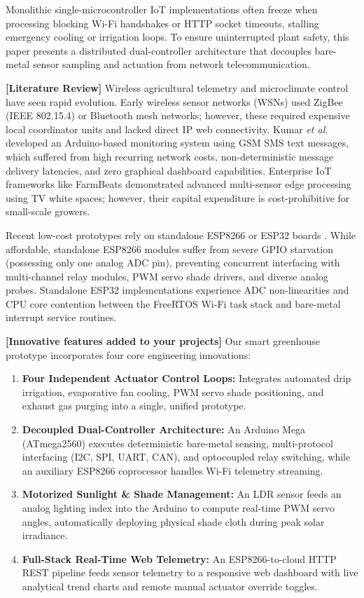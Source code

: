 \documentclass[conference]{IEEEtran}
\begin{document}
Monolithic single-microcontroller IoT implementations often freeze when processing blocking Wi-Fi handshakes or HTTP socket timeouts, stalling emergency cooling or irrigation loops. To ensure uninterrupted plant safety, this paper presents a distributed dual-controller architecture that decouples bare-metal sensor sampling and actuation from network telecommunication.

\noindent \textbf{[Literature Review]} Wireless agricultural telemetry and microclimate control have seen rapid evolution. Early wireless sensor networks (WSNs) used ZigBee (IEEE 802.15.4) or Bluetooth mesh networks; however, these required expensive local coordinator units and lacked direct IP web connectivity. Kumar \textit{et al.} \cite{kumar2020iot} developed an Arduino-based monitoring system using GSM SMS text messages, which suffered from high recurring network costs, non-deterministic message delivery latencies, and zero graphical dashboard capabilities. Enterprise IoT frameworks like FarmBeats \cite{vasisht2017farmbeats} demonstrated advanced multi-sensor edge processing using TV white spaces; however, their capital expenditure is cost-prohibitive for small-scale growers. 

Recent low-cost prototypes rely on standalone ESP8266 or ESP32 boards \cite{kodali2016iot, rao2018iot}. While affordable, standalone ESP8266 modules suffer from severe GPIO starvation (possessing only one analog ADC pin), preventing concurrent interfacing with multi-channel relay modules, PWM servo shade drivers, and diverse analog probes. Standalone ESP32 implementations experience ADC non-linearities and CPU core contention between the FreeRTOS Wi-Fi task stack and bare-metal interrupt service routines. 

\noindent \textbf{[Innovative features added to your projects]} Our smart greenhouse prototype incorporates four core engineering innovations:
\begin{enumerate}
    \item \textbf{Four Independent Actuator Control Loops:} Integrates automated drip irrigation, evaporative fan cooling, PWM servo shade positioning, and exhaust gas purging into a single, unified prototype.
    \item \textbf{Decoupled Dual-Controller Architecture:} An Arduino Mega (ATmega2560) executes deterministic bare-metal sensing, multi-protocol interfacing (I2C, SPI, UART, CAN), and optocoupled relay switching, while an auxiliary ESP8266 coprocessor handles Wi-Fi telemetry streaming.
    \item \textbf{Motorized Sunlight \& Shade Management:} An LDR sensor feeds an analog lighting index into the Arduino to compute real-time PWM servo angles, automatically deploying physical shade cloth during peak solar irradiance.
    \item \textbf{Full-Stack Real-Time Web Telemetry:} An ESP8266-to-cloud HTTP REST pipeline feeds sensor telemetry to a responsive web dashboard with live analytical trend charts and remote manual actuator override toggles.
\end{enumerate}
\end{document}
